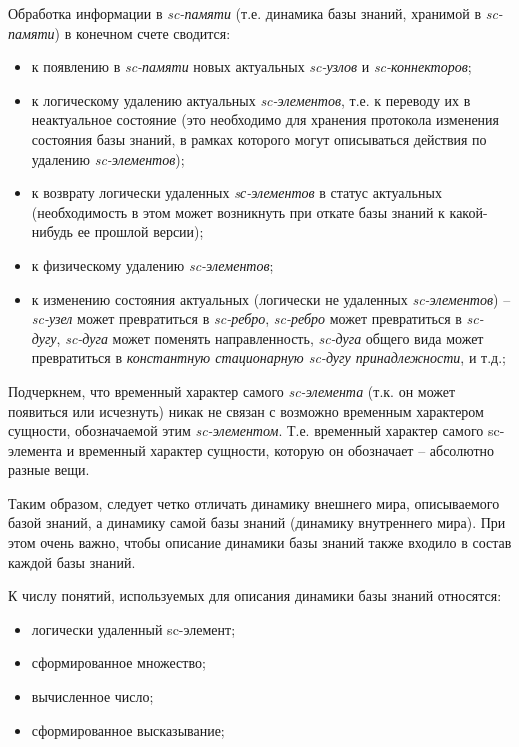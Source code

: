 Обработка информации в \textit{sc-памяти} (т.е. динамика базы знаний, хранимой в \textit{sc-памяти}) в конечном счете сводится:
\begin{itemize}
	\item к появлению в \textit{sc-памяти} новых актуальных \textit{sc-узлов} и \textit{sc-коннекторов};
	\item к логическому удалению актуальных \textit{sc-элементов}, т.е. к переводу их в неактуальное состояние (это необходимо для хранения протокола изменения состояния базы знаний, в рамках которого могут описываться действия по удалению \textit{sc-элементов});
	\item к возврату логически удаленных \textit{sс-элементов} в статус актуальных (необходимость в этом может возникнуть при откате базы знаний к какой-нибудь ее прошлой версии);
	\item к физическому удалению \textit{sc-элементов};
	\item к изменению состояния актуальных (логически не удаленных \textit{sc-элементов}) -- \textit{sc-узел} может превратиться в \textit{sc-ребро}, \textit{sc-ребро} может превратиться в \textit{sc-дугу}, \textit{sc-дуга} может поменять направленность, \textit{sc-дуга} общего вида может превратиться в \textit{константную стационарную sc-дугу принадлежности}, и т.д.;
\end{itemize}

Подчеркнем, что временный характер самого \textit{sc-элемента} (т.к. он может появиться или исчезнуть) никак не связан с возможно временным характером сущности, обозначаемой этим \textit{sc-элементом}. Т.е. временный характер самого sc-элемента и временный характер сущности, которую он обозначает -- абсолютно разные вещи.

Таким образом, следует четко отличать динамику внешнего мира, описываемого базой знаний, а динамику самой базы знаний (динамику внутреннего мира). При этом очень важно, чтобы описание динамики базы знаний также входило в состав каждой базы знаний.

К числу понятий, используемых для описания динамики базы знаний относятся:
\begin{itemize}
	\item логически удаленный sc-элемент;
	\item сформированное множество;
	\item вычисленное число;
	\item сформированное высказывание;
\end{itemize}

